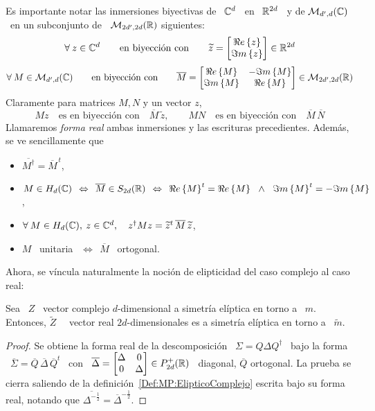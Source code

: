 Es importante notar  las inmersiones biyectivas de \ $\mathbb{C}^d$  \ en \ $\mathbb{R}^{2
  d}$ \  y de $\mathcal{M}_{d',d}(\mathbb{C})$ \  en un subconjunto de  \ $\mathcal{M}_{2 d', 2d}(\mathbb{R})$
siguientes:
%
\[
\forall \: z  \in \mathbb{C}^d \qquad \mbox{en biyecci\'on  con} \qquad \widetilde{z}
= \begin{bmatrix} \Re e \left\{ z \right\}\\ \Im m \left\{ z \right\} \end{bmatrix} \in \mathbb{R}^{2 d}
\]
%
\[
\forall  \:  M \in  \mathcal{M}_{d',d}(\mathbb{C})  \qquad  \mbox{en  biyecci\'on con}  \qquad
\overline{M}   =   \begin{bmatrix}   \Re e \left\{ M \right\}   &  -   \Im m \left\{ M \right\}\\   \Im m \left\{ M \right\}   &
  \Re e \left\{ M \right\} \end{bmatrix} \in \mathcal{M}_{2d',2d}(\mathbb{R})
\]
%
Claramente para matrices $M, N$ y un vector $z$,
%
\[
M z \quad \mbox{es en biyecci\'on con} \quad \overline{M} \, \widetilde{z}, \qquad
M N \quad \mbox{es en biyecci\'on con} \quad \overline{M} \, \overline{N}
\]
%
Llamaremos   {\em    forma   real}   ambas   inmersiones    y   las   escrituras
precedientes. Adem\'as, se ve sencillamente que
%
\begin{itemize}
\item  $\displaystyle   \overline{M^\dag}  =  \overline{M}^{\,   t}$,
%
\item $\displaystyle M \in H_d(\mathbb{C}) \:\: \Leftrightarrow \:\:
  \overline{M}  \in  S_{2d}(\mathbb{R})  \:\:  \Leftrightarrow  \:\:  \Re e \left\{ M \right\}^t  =
  \Re e \left\{ M \right\} \, \:\: \wedge \:\: \, \Im m \left\{ M \right\}^t = - \Im m \left\{ M \right\}$,
%
\item  $\forall \:  M \in  H_d(\mathbb{C}), \:  z  \in \mathbb{C}^d,  \quad z^\dag  M z  =
  \widetilde{z}^t \, \overline{M} \, \widetilde{z}$,
%
\item $M$ \ unitaria $\:\:\Leftrightarrow\:\: \overline{M}$ \ ortogonal.
\end{itemize}
%

Ahora, se v\'incula naturalmente la noci\'on de elipticidad del caso complejo al
caso real:
%
\begin{lema}
  Sea \ $Z$ \ vector complejo  $d$-dimensional a simetr\'ia el\'iptica en torno a
  \  $m$.  Entonces,  $\widetilde{Z}$ \  \ vector  real $2d$-dimensionales  es a
  simetr\'ia el\'iptica en torno a \ $\widetilde{m}$.
\end{lema}
%
\begin{proof}
  Se obtiene la forma real de la descomposici\'on \ $\Sigma = Q \Delta Q^\dag$ \
  bajo  la forma  \ $\overline{\Sigma}  = \overline{Q}  \,  \overline{\Delta} \,
  \overline{Q}^t$ \ con \ $\overline{\Delta}  = \begin{bmatrix} \Delta & 0\\ 0 &
    \Delta  \end{bmatrix}   \in  P_{2d}^+(\mathbb{R})$  \   diagonal,  $\overline{Q}$
  ortogonal.       La     prueba      se     cierra      saliendo      de     la
  definici\'on~\ref{Def:MP:ElipticoComplejo} escrita bajo su forma real, notando
  que $\overline{\Delta^{-\frac12}} = \overline{\Delta}^{-\frac12}$.
\end{proof}

